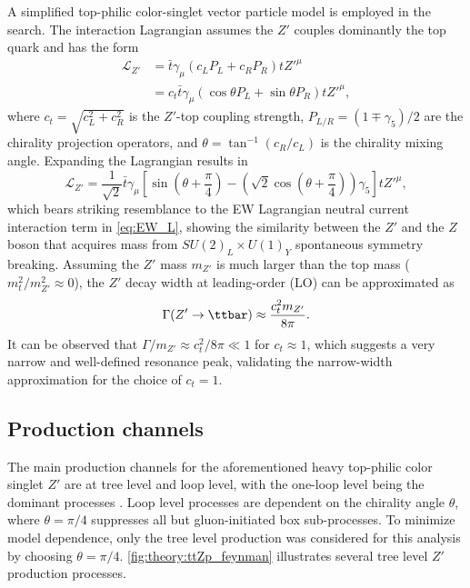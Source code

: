 \documentclass[../thesis.tex]{subfiles}
\begin{document}
A simplified top-philic color-singlet vector particle model \citep{theory:ttZp,theory:ttZp_LHC} is employed in the search. The interaction Lagrangian assumes the $Z'$ couples dominantly the top quark and has the form
\begin{equation}
\begin{aligned}
\mathcal{L}_{Z'} &= \bar{t}\gamma_\mu\left(c_L P_L + c_R P_R\right) tZ'^{\mu}\\
&= c_t \bar{t}\gamma_\mu\left(\cos\theta P_L + \sin\theta P_R\right) tZ'^{\mu},
\end{aligned}
\end{equation}
where $c_t=\sqrt{c_L^2+c_R^2}$ is the $Z'$-top coupling strength, $P_{L/R}=(1\mp \gamma_5)/2$ are the chirality projection operators, and $\theta = \tan^{-1}(c_R/c_L)$ is the chirality mixing angle. Expanding the Lagrangian results in
\begin{equation}
\mathcal{L}_{Z'} = \frac{1}{\sqrt{2}}\bar{t}\gamma_\mu\left[
\sin\left(\theta+\frac{\pi}{4}\right) - \left(\sqrt{2}\cos\left(\theta+\frac{\pi}{4}\right)\right)\gamma_5
\right] tZ'^{\mu},
\end{equation}
which bears striking resemblance to the \acs{EW} Lagrangian neutral current interaction term in \autoref{eq:EW_L}, showing the similarity between the $Z'$ and the $Z$ boson that acquires mass from $SU(2)_L\times U(1)_Y$ spontaneous symmetry breaking. Assuming the $Z'$ mass $m_{Z'}$ is much larger than the top mass ($m_t^2/m_{Z'}^2 \approx 0$), the $Z'$ decay width at leading-order (\acs{LO}) can be approximated as
\begin{equation}
\Gamma(Z' \rightarrow \ttbar) \approx \frac{c_t^2 m_{Z'}}{8\pi}.
\end{equation}
It can be observed that $\Gamma/m_{Z'} \approx c_t^2/8\pi \ll 1$ for $c_t\approx 1$, which suggests a very narrow and well-defined resonance peak, validating the narrow-width approximation for the choice of $c_t=1$.

\subsection{Production channels}

The main production channels for the aforementioned heavy top-philic color singlet $Z'$ are at tree level and loop level, with the one-loop level being the dominant processes \citep{theory:ttZp}. Loop level processes are dependent on the chirality angle $\theta$, where $\theta=\pi/4$ suppresses all but gluon-initiated box sub-processes. To minimize model dependence, only the tree level production was considered for this analysis by choosing $\theta=\pi/4$. \autoref{fig:theory:ttZp_feynman} illustrates several tree level $Z'$ production processes.
\end{document}
